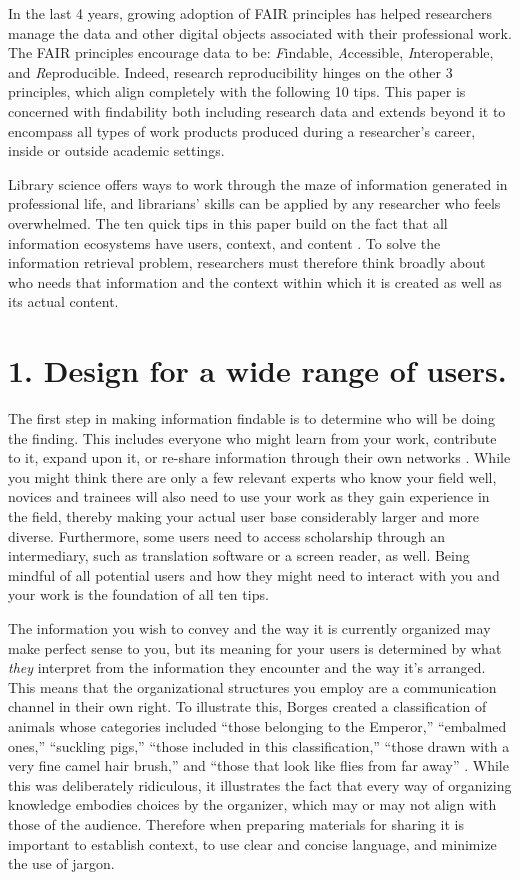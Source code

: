 \documentclass[10pt,letterpaper]{article}
\newcommand{\rulemajor}[1]{\section*{#1}}
\begin{document}
In the last 4 years, growing adoption of FAIR principles \cite{Wilkinson2016} has helped
researchers manage the data and other digital objects associated with their professional
work. The FAIR principles encourage data to be: \emph{F}indable, \emph{A}ccessible,
\emph{I}nteroperable, and \emph{R}eproducible. Indeed, research reproducibility hinges
on the other 3 principles, which align completely with the following 10 tips. 
This paper is concerned with findability both including research data and extends beyond
it to encompass all types of work products produced during a researcher's career, 
inside or outside academic settings.

Library science offers ways to work through the maze of information generated in
professional life, and librarians' skills can be applied by any researcher who
feels overwhelmed. The ten quick tips in this paper build on the fact that all
information ecosystems have users, context, and content \cite{Rosenfeld2015}.
To solve the information retrieval problem, researchers must therefore think
broadly about who needs that information and the context within which it is
created as well as its actual content.

\rulemajor{1. Design for a wide range of users.}

The first step in making information findable is to determine who will be doing
the finding. This includes everyone who might learn from your work, contribute to it,
expand upon it, or re-share information through their own networks \cite{Covert2014}.
While you might think there are only a few relevant experts who know your field well, 
novices and trainees will also need to use your work as they gain experience in the field,
thereby making your actual user base considerably larger and more diverse. Furthermore,
some users need to access scholarship through an intermediary, such as translation
software or a screen reader, as well. Being mindful of all potential users and how they
might need to interact with you and your work is the foundation of all ten tips.

The information you wish to convey and the way it is currently organized may
make perfect sense to you, but its meaning for your users is determined by what
\emph{they} interpret from the information they encounter and the way it's
arranged. This means that the organizational structures you employ are a
communication channel in their own right. To illustrate this, Borges created a
classification of animals whose categories included ``those belonging to the
Emperor,'' ``embalmed ones,'' ``suckling pigs,'' ``those included in this
classification,'' ``those drawn with a very fine camel hair brush,'' and ``those
that look like flies from far away'' \cite{Borges2000}. While this was
deliberately ridiculous, it illustrates the fact that every way of organizing
knowledge embodies choices by the organizer, which may or may not align with
those of the audience. Therefore when preparing materials for sharing it is important
to establish context, to use clear and concise language, and minimize the use of jargon.
\end{document}
